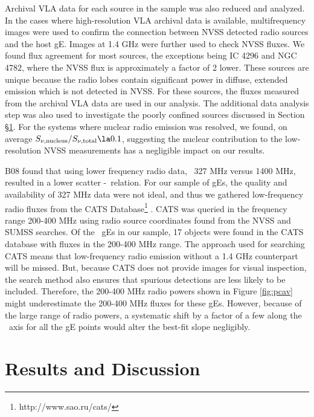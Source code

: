 \documentclass{emulateapj}
\begin{document}
Archival VLA data for each source in the sample was also reduced and
analyzed. In the cases where high-resolution VLA archival data is
available, multifrequency images were used to confirm the connection
between NVSS detected radio sources and the host gE. Images at 1.4 GHz
were further used to check NVSS fluxes. We found flux agreement for
most sources, the exceptions being IC 4296 and NGC 4782, where the
NVSS flux is approximately a factor of 2 lower. These sources are
unique because the radio lobes contain significant power in diffuse,
extended emission which is not detected in NVSS. For these sources,
the fluxes measured from the archival VLA data are used in our
analysis. The additional data analysis step was also used to
investigate the poorly confined sources discussed in Section
\S\ref{sec:r&d}. For the systems where nuclear radio emission was
resolved, we found, on average $S_{\nu,\mathrm{nucleus}} /
S_{\nu,\mathrm{total}} \la 0.1$, suggesting the nuclear contribution
to the low-resolution NVSS measurements has a negligible impact on our
results.

B08 found that using lower frequency radio data, \ie\ 327 MHz versus
1400 MHz, resulted in a lower scatter \pcav-\prad\ relation. For our
sample of gEs, the quality and availability of 327 MHz data were not
ideal, and thus we gathered low-frequency radio fluxes from the CATS
Database\footnote{http://www.sao.ru/cats/} \citep{cats}. CATS was
queried in the frequency range 200-400 MHz using radio source
coordinates found from the NVSS and SUMSS searches. Of the
\samp\ gEs in our sample, 17 objects were found in the CATS database
with fluxes in the 200-400 MHz range. The approach used for searching
CATS means that low-frequency radio emission without a 1.4 GHz
counterpart will be missed. But, because CATS does not provide images
for visual inspection, the search method also ensures that spurious
detections are less likely to be included. Therefore, the 200-400 MHz
radio powers shown in Figure \ref{fig:pcav} might underestimate the
200-400 MHz fluxes for these gEs. However, because of the large range
of radio powers, a systematic shift by a factor of a few along the
\prad\ axis for all the gE points would alter the best-fit slope
negligibly.

\section{Results and Discussion}
\label{sec:r&d}
\end{document}

